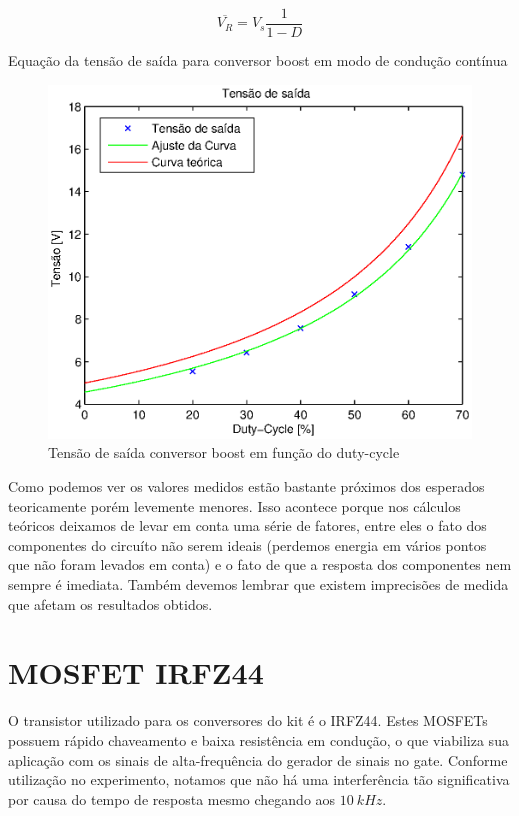 \documentclass{article}
\begin{document}
\begin{capequ}[H]
	\begin{equation}
	\overline{V_R} = V_s\frac{1}{1 - D}
	\end{equation}
	\caption{Equação da tensão de saída para conversor boost em modo de condução contínua}
	\label{eq:bod}
\end{capequ}


\begin{figure}[H]
	\centering
	\includegraphics[width=0.7\linewidth]{Dados/boost/tvd}
	\caption{Tensão de saída conversor boost em função do duty-cycle}
	\label{fig:botvd}
\end{figure}

Como podemos ver os valores medidos estão bastante próximos dos esperados teoricamente porém levemente menores. Isso acontece porque nos cálculos teóricos deixamos de levar em conta uma série de fatores, entre eles o fato dos componentes do circuíto não serem ideais (perdemos energia em vários pontos que não foram levados em conta) e o fato de que a resposta dos componentes nem sempre é imediata. Também devemos lembrar que existem imprecisões de medida que afetam os resultados obtidos.

\section{MOSFET IRFZ44}

O transistor utilizado para os conversores do kit é o IRFZ44. Estes MOSFETs possuem rápido chaveamento e baixa resistência em condução, o que viabiliza sua aplicação com os sinais de alta-frequência do gerador de sinais no gate. Conforme utilização no experimento, notamos que não há uma interferência tão significativa por causa do tempo de resposta mesmo chegando aos $10\ kHz$.
\end{document}
